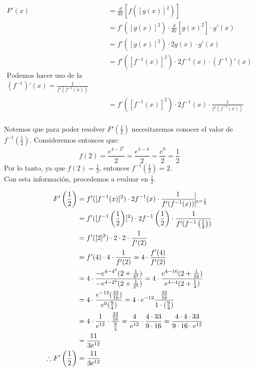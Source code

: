 \documentclass[12pt]{article}
\begin{document}
\begin{enumerate}
 \begin{equation*}
  \begin{split}
    F'(x)
    &= \frac{d}{dx} \left[ f([g(x)]^2) \right] \\
    &= f'([g(x)]^2) \cdot  \frac{d}{dx} \left[g(x)^2\right] \cdot g'(x) \\
    &= f'([g(x)]^2) \cdot  2g(x) \cdot g'(x) \\
    &= f'([f^{-1}(x)]^2) \cdot  2f^{-1}(x) \cdot (f^{-1})'(x) \\
    \text{Podemos hacer uso de la fórmula } \\
    (f^{-1})'(x) = \frac{1}{f'(f^{-1}(x))}\\
    &= f'([f^{-1}(x)]^2) \cdot  2f^{-1}(x) \cdot \frac{1}{f'(f^{-1}(x))} \\
  \end{split}
\end{equation*}

Notemos que para poder resolver  $F'\left(\frac{1}{2}\right)$ necesitaremos conocer el valor de $f^{-1}\left(\frac{1}{2}\right)$. Consideremos entonces que:\\
  \[
  f(2) = \frac{e^{4-2^2}}{2} = \frac{e^{4-4}}{2} = \frac{e^{0}}{2} = \frac{1}{2}
  \]
  Por lo tanto, ya que $f(2) = \frac{1}{2}$, entonces  $f^{-1}\left(\frac{1}{2}\right) = 2$.\\
  Con esta información, procedemos a evaluar en $\frac{1}{2}$.


\begin{equation*}
  \begin{split}
    F'\left(\frac{1}{2}\right)
    &=  f'([f^{-1}(x)]^2) \cdot  2f^{-1}(x) \cdot \frac{1}{f'(f^{-1}(x))} \vline _{x=\frac{1}{2}} \\
    &=   f'([f^{-1} \left(\frac{1}{2}\right)]^2) \cdot  2f^{-1}\left(\frac{1}{2}\right) \cdot \frac{1}{f'(f^{-1}\left(\frac{1}{2}\right))}  \\
    &=   f'([2]^2) \cdot  2\cdot 2 \cdot \frac{1}{f'(2)}  \\
    &=   f'(4) \cdot 4 \cdot \frac{1}{f'(2)}  
    =  4 \cdot \frac{ f'(4)}{f'(2)}  \\
    &=  4 \cdot \frac{  -e^{4-4^2} (2 +\frac{1}{4^2}) }{ -e^{4-2^2} (2 +\frac{1}{2^2})}  
    =  4 \cdot \frac{e^{4-16} (2 +\frac{1}{16}) }{e^{4-4} (2 +\frac{1}{4})}  \\
    &=  4 \cdot \frac{e^{-12} (\frac{33}{16}) }{e^{0} (\frac{9}{4})}  
    =  4 \cdot e^{-12} \frac{\frac{33}{16}}{ 1\cdot (\frac{9}{4})}  \\
    &=  4 \cdot \frac{1}{e^{12}} \cdot \frac{\frac{33}{16}}{ \frac{9}{4}}  
    =  \frac{4}{e^{12}} \cdot \frac{4 \cdot 33}{9\cdot 16} 
    =  \frac{ 4 \cdot 4 \cdot 33}{9\cdot 16\cdot e^{12}} \\
    &=  \frac{11}{3e^{12}} \\
    \therefore
   F'\left(\frac{1}{2}\right)
    & = \frac{11}{3e^{12}}  \\
  \end{split}
\end{equation*}

\end{enumerate}
\end{document}

